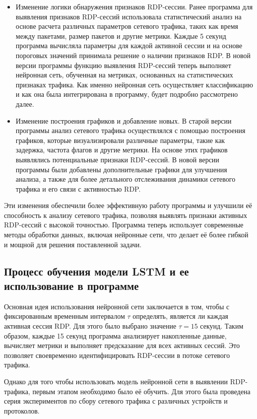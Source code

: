 \documentclass[bachelor, och, coursework]{SCWorks}
\begin{document}
\begin{itemize}
  \item Изменение логики обнаружения признаков RDP-сессии. Ранее программа для выявления признаков RDP-сессий использовала статистический анализ 
  на основе расчета различных параметров сетевого трафика, таких как время между пакетами, размер пакетов и другие метрики. Каждые 5 секунд программа 
  вычисляла параметры для каждой активной сессии и на основе пороговых значений принимала решение о наличии признаков RDP. В новой версии программы 
  функцию выявления RDP-сессий теперь выполняет нейронная сеть, обученная на метриках, основанных на статистических признаках трафика. Как именно 
  нейронная сеть осуществляет классификацию и как она была интегрирована в программу, будет подробно рассмотрено далее.

  \item Изменение построения графиков и добавление новых. В старой версии программы анализ сетевого трафика осуществлялся с помощью построения 
  графиков, которые визуализировали различные параметры, такие как задержка, частота флагов и другие метрики. На основе этих графиков выявлялись потенциальные 
  признаки RDP-сессий. В новой версии программы были добавлены дополнительные графики для улучшения анализа, а также для более детального отслеживания динамики 
  сетевого трафика и его связи с активностью RDP.
\end{itemize}

Эти изменения обеспечили более эффективную работу программы и улучшили её способность к анализу сетевого трафика, позволяя выявлять признаки 
активных RDP-сессий с высокой точностью. Программа теперь использует современные методы обработки данных, включая нейронные сети, что делает 
её более гибкой и мощной для решения поставленной задачи.

\subsection{Процесс обучения модели LSTM и ее использование в программе}

Основная идея использования нейронной сети заключается в том, чтобы с фиксированным временным интервалом $\tau$ определять, 
является ли каждая активная сессия RDP. Для этого было выбрано значение $\tau = 15$ секунд. Таким образом, каждые 15 секунд 
программа анализирует накопленные данные, вычисляет метрики и выполняет предсказание для всех активных сессий. Это позволяет 
своевременно идентифицировать RDP-сессии в потоке сетевого трафика.  

Однако для того чтобы использовать модель нейронной сети в выявлении RDP-трафика, первым этапом необходимо было её обучить. Для этого была проведена 
серия экспериментов по сбору сетевого трафика с различных устройств и протоколов.  
\end{document}
